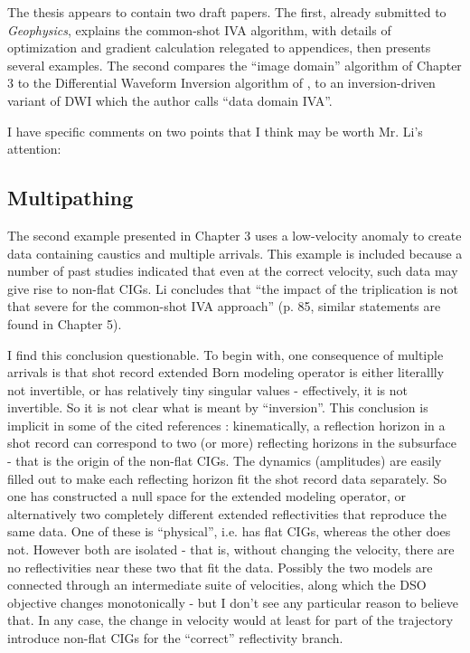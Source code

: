 The thesis appears to contain two draft papers. The first, already submitted to {\em Geophysics}, explains the common-shot IVA algorithm, with details of optimization and gradient calculation relegated to appendices, then presents several examples. The second compares the ``image domain'' algorithm of Chapter 3 to the Differential Waveform Inversion algorithm of \cite{ChaurisPlessix:EAGE13}, to an inversion-driven variant of DWI which the author calls ``data domain IVA''. 

 I have specific comments on two points that I think may be worth Mr. Li's attention:

\subsection{Multipathing}

The second example presented in Chapter 3 uses a low-velocity anomaly to create data containing caustics and multiple arrivals. This example is included because a number of past studies indicated that even at the correct velocity, such data may give rise to non-flat CIGs. Li concludes that ``the impact of the triplication is not that severe for the common-shot IVA approach'' (p. 85, similar statements are found in Chapter 5).

I find this conclusion questionable. To begin with, one consequence of multiple arrivals is that shot record extended Born modeling operator is either literallly not invertible, or has relatively tiny singular values - effectively, it is not invertible. So it is not clear what is meant by ``inversion''.  This conclusion is implicit in some of the cited references \cite[]{NolanSymes:96,StolkSymes:04}: kinematically, a reflection horizon in a shot record can correspond to two (or more) reflecting horizons in the subsurface - that is the origin of the non-flat CIGs. The dynamics (amplitudes) are easily filled out to make each reflecting horizon fit the shot record data separately. So one has constructed a null space for the extended modeling operator, or alternatively two completely different extended reflectivities that reproduce the same data. One of these is ``physical'', i.e. has flat CIGs, whereas the other does not. However both are isolated - that is, without changing the velocity, there are no reflectivities near these two that fit the data. Possibly the two models are connected through an intermediate suite of velocities, along which the DSO objective changes monotonically - but I don't see any particular reason to believe that. In any case, the change in velocity would at least for part of the trajectory introduce non-flat CIGs for the ``correct'' reflectivity branch. 

